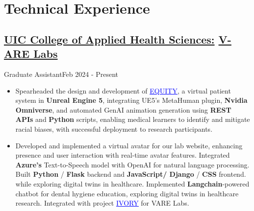 \section{Technical Experience}
\subsection{\href{https://ahs.uic.edu}{UIC College of Applied Health Sciences:} \href{https://vare.ahs.uic.edu} {V-ARE Labs} }{Graduate Assistant}{Feb 2024 - Present}
\begin{itemize}

    \item Spearheaded the design and development of \href{https://vare.ahs.uic.edu/projects/}{\textcolor{blue}{\underline{EQUITY}}}, a virtual patient system in \textbf{Unreal Engine 5}, integrating UE5’s MetaHuman plugin, \textbf{Nvidia Omniverse}, and automated GenAI animation generation using \textbf{REST APIs} and \textbf{Python} scripts, enabling medical learners to identify and mitigate racial biases, with successful deployment to research participants.

    \item Developed and implemented a virtual avatar for our lab website, enhancing presence and user interaction with real-time avatar features. Integrated \textbf{Azure’s} Text-to-Speech model with OpenAI for natural language processing. Built \textbf{Python} / \textbf{Flask} backend and \textbf{JavaScript/ Django} / \textbf{CSS} frontend. while exploring digital twins in healthcare. Implemented \textbf{Langchain}-powered chatbot for dental hygiene education, exploring digital twins in healthcare research. Integrated with project \href{https://vare.ahs.uic.edu/projects/}{\textcolor{blue}{\underline{IVORY}}} for VARE Labs.
    \vspace{0.25em}
\end{itemize}
